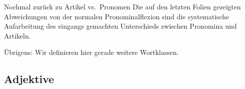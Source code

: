 \begin{frame}
  {Nochmal zurück zu Artikel vs.\ Pronomen}
  \pause
  Die auf den letzten Folien gezeigten Abweichungen von der normalen Pronominalflexion sind die systematische Aufarbeitung des eingangs gemachten Unterschieds zwischen Pronomina und Artikeln.\\
  \pause
  \Zeile
  \begin{center}
  \end{center}
  \pause
  \Halbzeile
  Übrigens: Wir definieren hier gerade weitere Wortklassen.
\end{frame}


\subsection{Adjektive}

